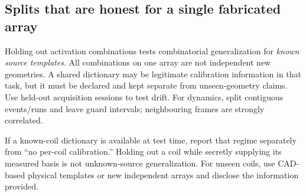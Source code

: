 \subsection{Splits that are honest for a single fabricated array}
Holding out activation combinations tests combinatorial generalization for \emph{known source templates}. All combinations on one array are not independent new geometries. A shared dictionary may be legitimate calibration information in that task, but it must be declared and kept separate from unseen-geometry claims. Use held-out acquisition sessions to test drift. For dynamics, split contiguous events/runs and leave guard intervals; neighbouring frames are strongly correlated.

If a known-coil dictionary is available at test time, report that regime separately from ``no per-coil calibration.'' Holding out a coil while secretly supplying its measured basis is not unknown-source generalization. For unseen coils, use CAD-based physical templates or new independent arrays and disclose the information provided.

